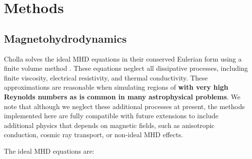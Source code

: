 \documentclass[modern, linenumbers]{aastex631}
\begin{document}
\section{Methods}
\label{sec:methods}



\subsection{Magnetohydrodynamics}
\label{sec:methods-mhd}

Cholla solves the ideal MHD equations in their conserved Eulerian form using a finite volume method \citep{Godunov}. These equations neglect all dissipative processes, including finite viscosity, electrical resistivity, and thermal conductivity. These approximations are reasonable when simulating regions of \textbf{with very high Reynolds numbers as is common in many astrophysical problems}. We note that although we neglect these additional processes at present, the methods implemented here are fully compatible with future extensions to include additional physics that depends on magnetic fields, such as anisotropic conduction, cosmic ray transport, or non-ideal MHD effects.

The ideal MHD equations are:
\end{document}
